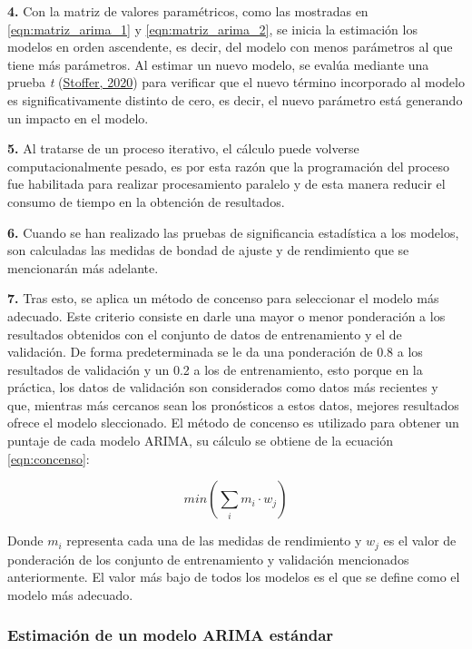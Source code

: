 \documentclass[
]{article}
\begin{document}
\textbf{4.} Con la matriz de valores paramétricos, como las mostradas en
\ref{eqn:matriz_arima_1} y \ref{eqn:matriz_arima_2}, se inicia la
estimación los modelos en orden ascendente, es decir, del modelo con
menos parámetros al que tiene más parámetros. Al estimar un nuevo
modelo, se evalúa mediante una prueba \emph{t}
(\protect\hyperlink{ref-astsa}{Stoffer, 2020}) para verificar que el
nuevo término incorporado al modelo es significativamente distinto de
cero, es decir, el nuevo parámetro está generando un impacto en el
modelo.

\textbf{5.} Al tratarse de un proceso iterativo, el cálculo puede
volverse computacionalmente pesado, es por esta razón que la
programación del proceso fue habilitada para realizar procesamiento
paralelo y de esta manera reducir el consumo de tiempo en la obtención
de resultados.

\textbf{6.} Cuando se han realizado las pruebas de significancia
estadística a los modelos, son calculadas las medidas de bondad de
ajuste y de rendimiento que se mencionarán más adelante.

\textbf{7.} Tras esto, se aplica un método de concenso para seleccionar
el modelo más adecuado. Este criterio consiste en darle una mayor o
menor ponderación a los resultados obtenidos con el conjunto de datos de
entrenamiento y el de validación. De forma predeterminada se le da una
ponderación de 0.8 a los resultados de validación y un 0.2 a los de
entrenamiento, esto porque en la práctica, los datos de validación son
considerados como datos más recientes y que, mientras más cercanos sean
los pronósticos a estos datos, mejores resultados ofrece el modelo
sleccionado. El método de concenso es utilizado para obtener un puntaje
de cada modelo ARIMA, su cálculo se obtiene de la ecuación
\ref{eqn:concenso}:

\begin{equation}
\label{eqn:concenso}
min\left( \sum_i {m_i}\cdot w_j \right)
\end{equation}

Donde \(m_i\) representa cada una de las medidas de rendimiento y
\(w_j\) es el valor de ponderación de los conjunto de entrenamiento y
validación mencionados anteriormente. El valor más bajo de todos los
modelos es el que se define como el modelo más adecuado.

\subsubsection{Estimación de un modelo ARIMA estándar}
\end{document}
